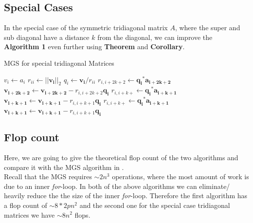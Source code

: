 \documentclass{article}
\numberwithin{pic}{section}
\numberwithin{lem}{section}
\numberwithin{thm}{section}
\numberwithin{cor}{section}
\theoremstyle{definition}
\numberwithin{ex}{section}
\numberwithin{defn}{section}
\theoremstyle{definition}
\theoremstyle{remark}
\newcommand{\norm}[1]{\ensuremath{\left | \left | #1 \right | \right |}}
\newlength\tindent
\renewcommand{\indent}{\hspace*{\tindent}}
\begin{document}
\subsection{Special Cases}
\indent In the special case of the symmetric tridiagonal matrix $A$, where the super and sub diagonal have a distance $k$ from the diagonal, we can improve the \textbf{Algorithm 1} even further using \textbf{Theorem} and \textbf{Corollary}.
\begin{algorithm}[H]
  \caption{MGS for special tridiagonal Matrices }
  \begin{algorithmic}[1]
   	\State$v_i\gets a_i$
    \EndFor
    \State$r_{ii}\gets \norm{\mathbf{v_i}}_2$
    \State$q_i\gets \mathbf{v_i} / r_{ii}$ 
    	\State$r_{i,i+2k+2}\gets \mathbf{q_i}^*\mathbf{a_{i+2k+2}}$
    	\State$\mathbf{v_{i+2k+2}}\gets\mathbf{v_{i+2k+2}} - r_{i,i+2k+2}\mathbf{q_i}$
    	\State$r_{i,i+k+}\gets \mathbf{q_i}^*\mathbf{a_{i+k+1}}$
    	\State$\mathbf{v_{i+k+1}}\gets\mathbf{v_{i+k+1}} - r_{i,i+k+1}\mathbf{q_i}$
    	\State$r_{i,i+k+}\gets \mathbf{q_i}^*\mathbf{a_{i+k+1}}$
    	\State$\mathbf{v_{i+k+1}}\gets\mathbf{v_{i+k+1}} - r_{i,i+k+1}\mathbf{q_i}$
       	\EndIf
    \EndFor
  \end{algorithmic}
\end{algorithm}
\subsection{Flop count}
\indent Here, we are going to give the theoretical flop count of the two algorithms and compare it with the MGS algorithm in \cite{nla}.\\
\indent Recall that the MGS requires $\sim 2n^3$ operations, where the most amount of work is due to an inner \textit{for}-loop.
In both of the above algorithms we can eliminate/ heavily reduce the the size of the inner \textit{for}-loop.
Therefore the first algorithm has a flop count of $\sim 8*2pn^2$ and the second
one for the special case tridiagonal matrices we have $\sim 8n^2$ flops.
\end{document}
